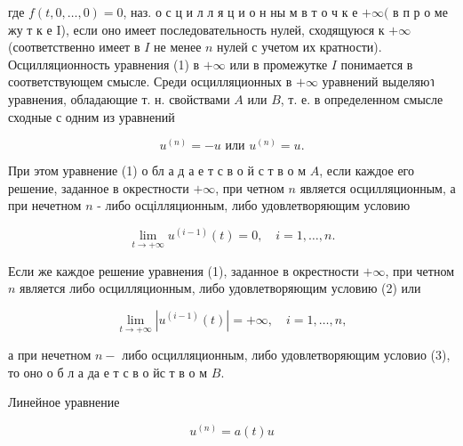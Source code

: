 \documentclass[10pt]{article}
\begin{document}
где $f(t, 0, \ldots, 0)=0$, наз. о с ц и л л я ц и о н ны м в т о ч к е $+\infty($ в п р о ме жу т к е I), если оно имеет последовательность нулей, сходящуюся к $+\infty$ (соответственно имеет в $I$ не менее $n$ нулей с учетом их кратности). Осцилляционность уравнения (1) в $+\infty$ или в промежутке $I$ понимается в соответствующем смысле. Среди осцилляционных в $+\infty$ уравнений выделяюา уравнения, обладающие т. н. свойствами $A$ или $B$, т. е. в определенном смысле сходные с одним из уравнений



\[

u^{(n)}=-u \text { или } u^{(n)}=u .

\]



При этом уравнение (1) о бл а д а е т с в о й с т в о м $A$, если каждое его решение, заданное в окрестности $+\infty$, при четном $n$ является осцилляционным, а при нечетном $n$ - либо осцілляционным, либо удовлетворяющим условию



\[

\lim _{t \rightarrow+\infty} u^{(i-1)}(t)=0, \quad i=1, \ldots, n .

\]



Если же каждое решение уравнения (1), заданное в окрестности $+\infty$, при четном $n$ является либо осцилляционным, либо удовлетворяющим условию (2) или



\[

\lim _{t \rightarrow+\infty}\left|u^{(i-1)}(t)\right|=+\infty, \quad i=1, \ldots, n,

\]



а при нечетном $n-$ либо осцилляционным, либо удовлетворяющим условио (3), то оно о б л а да е т с в о йс т в о м $B$.



Линейное уравнение



\[

u^{(n)}=a(t) u

\]
\end{document}
